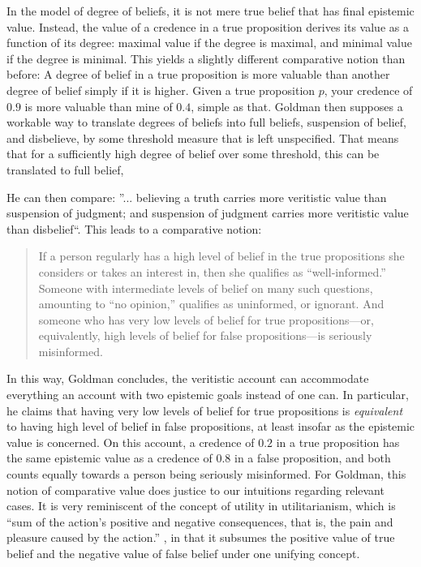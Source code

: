 \documentclass[12pt,numbers=noenddot]{scrartcl}
\begin{document}
In the model of degree of beliefs, it is not mere true belief that has final epistemic value. Instead, the value of a credence in a true proposition derives its value as a function of its degree: maximal value if the degree is maximal, and minimal value if the degree is minimal. This yields a slightly different comparative notion than before: A degree of belief in a true proposition is more valuable than another degree of belief simply if it is higher. Given a true proposition $p$, your credence of $0.9$ is more valuable than mine of $0.4$, simple as that.
Goldman then supposes a workable way to translate degrees of beliefs into full beliefs, suspension of belief, and disbelieve, by some threshold measure that is left unspecified. That means that for a sufficiently high degree of belief over some threshold, this can be translated to full belief, 

 He can then compare: ”... believing a truth carries more veritistic value than suspension of judgment; and suspension of judgment carries more veritistic value than disbelief“. This leads to a comparative notion:

\begin{quote}
    If a person regularly has a high level of belief in the true propositions she considers or takes an interest in, then she qualifies as “well‐informed.” Someone with intermediate levels of belief on many such questions, amounting to “no opinion,” qualifies as uninformed, or ignorant. And someone who has very low levels of belief for true propositions—or, equivalently, high levels of belief for false propositions—is seriously misinformed. \textcite[58]{Goldman2002-GOLTUO-2}
\end{quote}

In this way, Goldman concludes, the veritistic account can accommodate everything an account with two epistemic goals instead of one can. In particular, he claims that having very low levels of belief for true propositions is \emph{equivalent} to having high level of belief in false propositions, at least insofar as the epistemic value is concerned. On this account, a credence of $0.2$ in a true proposition has the same epistemic value as a credence of $0.8$ in a false proposition, and both counts equally towards a person being seriously misinformed. For Goldman, this notion of comparative value does justice to our intuitions regarding relevant cases. It is very reminiscent of the concept of utility in utilitarianism, which is “sum of the action's positive and negative consequences, that is, the pain and pleasure caused by the action.” \autocite{depaul_value_2001}, in that it subsumes the positive value of true belief and the negative value of false belief under one unifying concept.
\end{document}
